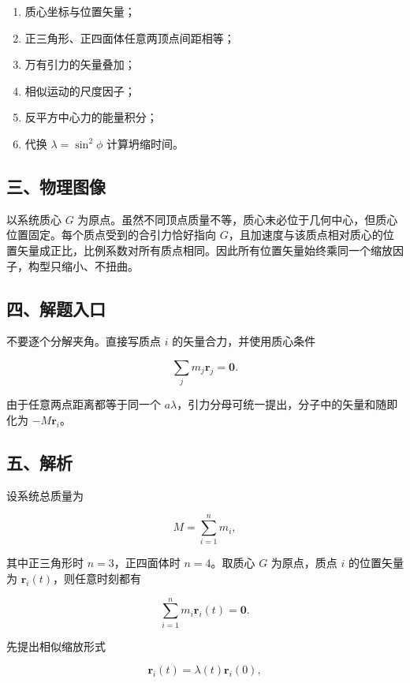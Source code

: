 \documentclass[12pt,a4paper,UTF8]{ctexart}
\newcommand{\tightlist}{\setlength{\itemsep}{0pt}\setlength{\parskip}{0pt}}
\begin{document}
\begin{enumerate}
\def\labelenumi{\arabic{enumi}.}
\tightlist
\item
  质心坐标与位置矢量；
\item
  正三角形、正四面体任意两顶点间距相等；
\item
  万有引力的矢量叠加；
\item
  相似运动的尺度因子；
\item
  反平方中心力的能量积分；
\item
  代换 \(\lambda=\sin^2\phi\) 计算坍缩时间。
\end{enumerate}

\subsection{三、物理图像}\label{ux4e09ux7269ux7406ux56feux50cf-1}

以系统质心 \(G\)
为原点。虽然不同顶点质量不等，质心未必位于几何中心，但质心位置固定。每个质点受到的合引力恰好指向
\(G\)，且加速度与该质点相对质心的位置矢量成正比，比例系数对所有质点相同。因此所有位置矢量始终乘同一个缩放因子，构型只缩小、不扭曲。

\subsection{四、解题入口}\label{ux56dbux89e3ux9898ux5165ux53e3-1}

不要逐个分解夹角。直接写质点 \(i\) 的矢量合力，并使用质心条件

\[
\sum_jm_j\boldsymbol r_j=\boldsymbol0.
\]

由于任意两点距离都等于同一个
\(a\lambda\)，引力分母可统一提出，分子中的矢量和随即化为
\(-M\boldsymbol r_i\)。

\subsection{五、解析}\label{ux4e94ux89e3ux6790-1}

设系统总质量为

\[
M=\sum_{i=1}^{n}m_i, \tag{1}
\]

其中正三角形时 \(n=3\)，正四面体时 \(n=4\)。取质心 \(G\) 为原点，质点
\(i\) 的位置矢量为 \(\boldsymbol r_i(t)\)，则任意时刻都有

\[
\sum_{i=1}^{n}m_i\boldsymbol r_i(t)=\boldsymbol0. \tag{2}
\]

先提出相似缩放形式

\[
\boldsymbol r_i(t)=\lambda(t)\boldsymbol r_i(0), \tag{3}
\]
\end{document}
